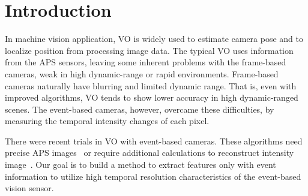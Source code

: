 \section{Introduction}
\label{sec:intro}

In machine vision application, \acf{VO} is widely used to estimate camera pose
and to localize position from processing image data. The typical \ac{VO} uses information
from the \ac{APS} sensors, leaving some inherent problems with the frame-based
cameras, weak in high dynamic-range or rapid environments. Frame-based cameras
naturally have blurring and limited dynamic range. That is, even with improved
algorithms, \ac{VO} tends to show lower accuracy in high dynamic-ranged scenes.
The event-based cameras, however, overcame these difficulties, by measuring
the temporal intensity changes of each pixel.

There were recent trials in \ac{VO} with event-based cameras. These algorithms need
precise \ac{APS} images~\cite{kueng2016low} or require additional calculations to
reconstruct intensity image~\cite{CGV-017}. Our goal is to build a method to
extract features only with event information to utilize high temporal
resolution characteristics of the event-based vision sensor.